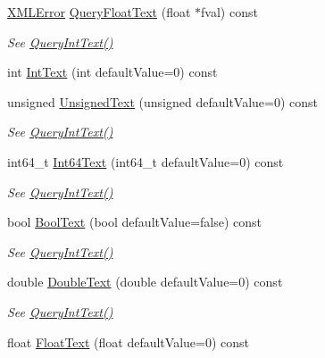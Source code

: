 \begin{DoxyCompactItemize}
\hyperlink{namespacetinyxml2_a1fbf88509c3ac88c09117b1947414e08}{X\+M\+L\+Error} \hyperlink{classtinyxml2_1_1_x_m_l_element_afa332afedd93210daa6d44b88eb11e29}{Query\+Float\+Text} (float $\ast$fval) const
\begin{DoxyCompactList}\small\item\em See \hyperlink{classtinyxml2_1_1_x_m_l_element_a926357996bef633cb736e1a558419632}{Query\+Int\+Text()} \end{DoxyCompactList}\item 
int \hyperlink{classtinyxml2_1_1_x_m_l_element_a37b0636adebb8a1a1bc965f60824cb3e}{Int\+Text} (int default\+Value=0) const
\item 
unsigned \hyperlink{classtinyxml2_1_1_x_m_l_element_a49bad014ffcc17b0b6119d5b2c97dfb5}{Unsigned\+Text} (unsigned default\+Value=0) const
\begin{DoxyCompactList}\small\item\em See \hyperlink{classtinyxml2_1_1_x_m_l_element_a926357996bef633cb736e1a558419632}{Query\+Int\+Text()} \end{DoxyCompactList}\item 
int64\+\_\+t \hyperlink{classtinyxml2_1_1_x_m_l_element_aab6151f7e3b4c2c0a8234e262d7b6b8a}{Int64\+Text} (int64\+\_\+t default\+Value=0) const
\begin{DoxyCompactList}\small\item\em See \hyperlink{classtinyxml2_1_1_x_m_l_element_a926357996bef633cb736e1a558419632}{Query\+Int\+Text()} \end{DoxyCompactList}\item 
bool \hyperlink{classtinyxml2_1_1_x_m_l_element_a68569f59f6382bcea7f5013ec59736d2}{Bool\+Text} (bool default\+Value=false) const
\begin{DoxyCompactList}\small\item\em See \hyperlink{classtinyxml2_1_1_x_m_l_element_a926357996bef633cb736e1a558419632}{Query\+Int\+Text()} \end{DoxyCompactList}\item 
double \hyperlink{classtinyxml2_1_1_x_m_l_element_a81b1ff0cf2f2cd09be8badc08b39a2b7}{Double\+Text} (double default\+Value=0) const
\begin{DoxyCompactList}\small\item\em See \hyperlink{classtinyxml2_1_1_x_m_l_element_a926357996bef633cb736e1a558419632}{Query\+Int\+Text()} \end{DoxyCompactList}\item 
float \hyperlink{classtinyxml2_1_1_x_m_l_element_a45444eb21f99ca46101545992dc2e927}{Float\+Text} (float default\+Value=0) const

\end{DoxyCompactItemize}
